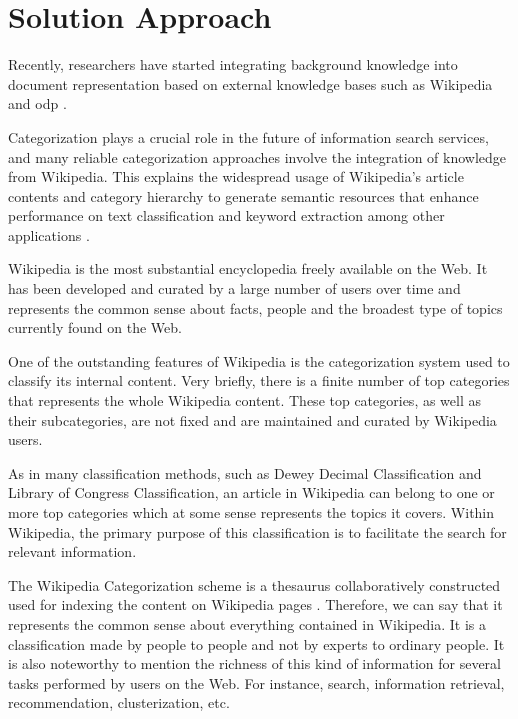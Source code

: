 \section{\hspace*{3pt}Solution Approach}

Recently, researchers have started integrating background knowledge into document representation based on external knowledge bases such as Wikipedia and \gls{odp} \cite{rafi2012content}.

Categorization plays a crucial role in the future of information search services, and many reliable categorization approaches involve the integration of knowledge from Wikipedia. This explains the widespread usage of Wikipedia’s article contents and category hierarchy to generate semantic resources that enhance performance on text classification and keyword extraction among other applications \cite{gantner2009automatic}. 

Wikipedia is the most substantial encyclopedia freely available on the Web. It has been developed and curated by a large number of users over time and represents the common sense about facts, people and the broadest type of topics currently found on the Web.

One of the outstanding features of Wikipedia is the categorization system used to classify its internal content. Very briefly, there is a finite number of top categories that represents the whole Wikipedia content. These top categories, as well as their subcategories, are not fixed and are maintained and curated by Wikipedia users. 

As in many classification methods, such as Dewey Decimal Classification\cite{mitchell1996dewey} and Library of Congress Classification\cite{chan2016guide}, an article in Wikipedia can belong to one or more top categories which at some sense represents the topics it covers. Within Wikipedia, the primary purpose of this classification is to facilitate the search for relevant information.


The Wikipedia Categorization scheme is a thesaurus collaboratively constructed used for indexing the content on Wikipedia pages \cite{voss2006collaborative}. Therefore, we can say that it represents the common sense about everything contained in Wikipedia. It is a classification made by people to people and not by experts to ordinary people. It is also noteworthy to mention the richness of this kind of information for several tasks performed by users on the Web. For instance, search, information retrieval, recommendation, clusterization, etc. 

